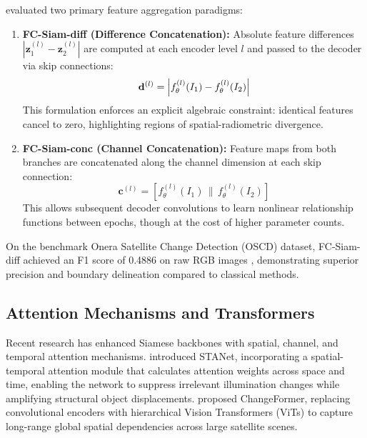 \citet{daudt2018fully} evaluated two primary feature aggregation paradigms:
\begin{enumerate}
    \item \textbf{FC-Siam-diff (Difference Concatenation):} Absolute feature differences $|\mathbf{z}_1^{(l)} - \mathbf{z}_2^{(l)}|$ are computed at each encoder level $l$ and passed to the decoder via skip connections:
    \begin{equation}
        \mathbf{d}^{(l)} = \left\lvert f_\theta^{(l)}(I_1) - f_\theta^{(l)}(I_2)\right\rvert
        \label{eq:fc_siam_diff}
    \end{equation}
    This formulation enforces an explicit algebraic constraint: identical features cancel to zero, highlighting regions of spatial-radiometric divergence.
    \item \textbf{FC-Siam-conc (Channel Concatenation):} Feature maps from both branches are concatenated along the channel dimension at each skip connection:
    \begin{equation}
        \mathbf{c}^{(l)} = \left[ f_\theta^{(l)}(I_1) \,\|\, f_\theta^{(l)}(I_2) \right]
        \label{eq:fc_siam_conc}
    \end{equation}
    This allows subsequent decoder convolutions to learn nonlinear relationship functions between epochs, though at the cost of higher parameter counts.
\end{enumerate}

On the benchmark Onera Satellite Change Detection (OSCD) dataset, FC-Siam-diff achieved an F1 score of 0.4886 on raw RGB images \citep{daudt2018urban}, demonstrating superior precision and boundary delineation compared to classical methods.

\subsection{Attention Mechanisms and Transformers}
Recent research has enhanced Siamese backbones with spatial, channel, and temporal attention mechanisms. \citet{chen2020spatial} introduced STANet, incorporating a spatial-temporal attention module that calculates attention weights across space and time, enabling the network to suppress irrelevant illumination changes while amplifying structural object displacements. \citet{bandara2022transformer} proposed ChangeFormer, replacing convolutional encoders with hierarchical Vision Transformers (ViTs) \citep{dosovitskiy2020image} to capture long-range global spatial dependencies across large satellite scenes.

